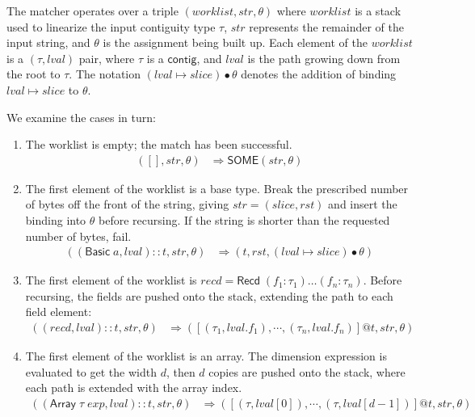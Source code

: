 \documentclass[a4paper,UKenglish,cleveref, autoref, thm-restate]{lipics-v2021}
\newcommand{\konst}[1]{\ensuremath{\mathsf{#1}}}
\newcommand{\lval}{\ensuremath{\mathit{lval}}}
\begin{document}
\begin{definition}

The matcher operates over a triple
$(\mathit{worklist},\mathit{str}, \theta)$ where $\mathit{worklist}$ is a stack used to
linearize the input contiguity type $\tau$, $\mathit{str}$ represents
the remainder of the input string, and $\theta$ is the assignment
being built up. Each element of the $\mathit{worklist}$ is a
$(\tau,\mathit{lval})$ pair, where $\tau$ is a \konst{contig}, and
$\mathit{lval}$ is the path growing down from the root to $\tau$. The
notation $(\lval \mapsto \mathit{slice}) \bullet \theta$ denotes the
addition of binding $\lval \mapsto \mathit{slice}$ to $\theta$.

We examine the cases in turn:

\begin{enumerate}

\item The worklist is empty; the match has been successful.
%
\begin{align*}
([], \mathit{str}, \theta) &\Rightarrow \konst{SOME}(\mathit{str}, \theta)
\end{align*}


\item The first element of the worklist is a base type. Break the
  prescribed number of bytes off the front of the string, giving
  $\mathit{str} = (\mathit{slice},\mathit{rst})$ and insert the
  binding into $\theta$ before recursing. If the string is shorter
  than the requested number of bytes, fail.
%
\begin{align*}
((\konst{Basic}\;a, \lval)::t, \mathit{str}, \theta)
   &\Rightarrow
  (t,\mathit{rst}, (\lval \mapsto \mathit{slice}) \bullet \theta)
\end{align*}

\item The first element of the worklist is $\mathit{recd} =
  \konst{Recd}\;(f_1 : \tau_1) \ldots (f_n : \tau_n)$. Before
  recursing, the fields are pushed onto the stack, extending the path
  to each field element:
%
\begin{align*}
((\mathit{recd}, \lval)::t, \mathit{str}, \theta)
   &\Rightarrow
  ([(\tau_1,\lval.f_1), \cdots , (\tau_n,\lval.f_n)] @ t,\mathit{str}, \theta)
\end{align*}

\item The first element of the worklist is an array. The dimension
  expression is evaluated to get the width $d$, then $d$ copies are
  pushed onto the stack, where each path is extended with the array
  index.
%
\begin{align*}
((\konst{Array}\; \tau \; \mathit{exp},\lval)::t, \mathit{str}, \theta)
   &\Rightarrow
  ([(\tau,\lval[0]), \cdots , (\tau,\lval[d-1])] @ t,\mathit{str}, \theta)
\end{align*}


\end{enumerate}
\end{definition}
\end{document}
